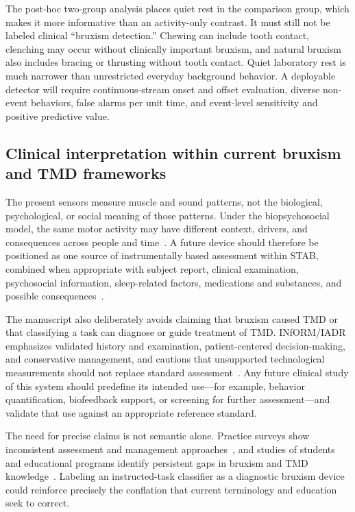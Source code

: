 \documentclass[pdflatex,sn-nature,iicol]{sn-jnl}
\begin{document}
The post-hoc two-group analysis places quiet rest in the comparison group, which makes it more informative than an activity-only contrast. It must still not be labeled clinical ``bruxism detection.'' Chewing can include tooth contact, clenching may occur without clinically important bruxism, and natural bruxism also includes bracing or thrusting without tooth contact. Quiet laboratory rest is much narrower than unrestricted everyday background behavior. A deployable detector will require continuous-stream onset and offset evaluation, diverse non-event behaviors, false alarms per unit time, and event-level sensitivity and positive predictive value.

\subsection{Clinical interpretation within current bruxism and TMD frameworks}

The present sensors measure muscle and sound patterns, not the biological, psychological, or social meaning of those patterns. Under the biopsychosocial model, the same motor activity may have different context, drivers, and consequences across people and time~\cite{manfredini2026biopsychosocial}. A future device should therefore be positioned as one source of instrumentally based assessment within STAB, combined when appropriate with subject report, clinical examination, psychosocial information, sleep-related factors, medications and substances, and possible consequences~\cite{manfredini2024standardised}.

The manuscript also deliberately avoids claiming that bruxism caused TMD or that classifying a task can diagnose or guide treatment of TMD. INfORM/IADR emphasizes validated history and examination, patient-centered decision-making, and conservative management, and cautions that unsupported technological measurements should not replace standard assessment~\cite{inform2025tmd}. Any future clinical study of this system should predefine its intended use---for example, behavior quantification, biofeedback support, or screening for further assessment---and validate that use against an appropriate reference standard.

The need for precise claims is not semantic alone. Practice surveys show inconsistent assessment and management approaches~\cite{mungia2025approaches}, and studies of students and educational programs identify persistent gaps in bruxism and TMD knowledge~\cite{nasanen2026competence,sangalli2026education}. Labeling an instructed-task classifier as a diagnostic bruxism device could reinforce precisely the conflation that current terminology and education seek to correct.
\end{document}
